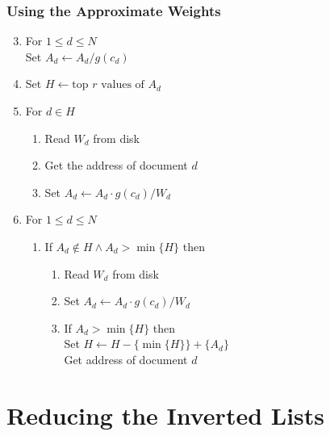 \documentclass[svgnames]{beamer}
\newcommand{\att}{\ensuremath{\leftarrow}}
\begin{document}
\begin{frame}
  \frametitle{Using the Approximate Weights}
  
  \begin{enumerate}
    \setcounter{enumi}{2}
  \item For $1 \leq d \leq N$\\
    \hspace{4ex}Set $A_d \att A_d/g(c_d)$
  \item Set $H \att \text{top $r$ values of $A_d$}$
  \item For $d \in H$
    \begin{enumerate}
    \item Read $W_d$ from disk
    \item Get the address of document $d$
    \item Set $A_d \att A_d \cdot g(c_d) / W_d$
    \end{enumerate}
  \item For $1 \leq d \leq N$
    \begin{enumerate}
    \item If $A_d \not\in H \wedge A_d > \min\{H\}$ then
      \begin{enumerate}
      \item Read $W_d$ from disk
      \item Set $A_d \att A_d \cdot g(c_d)/W_d$
      \item If $A_d > \min\{H\}$ then\\
        \hspace{4ex}Set $H \att H - \{\min\{H\}\} + \{A_d\}$\\
        \hspace{4ex}Get address of document $d$
      \end{enumerate}
    \end{enumerate}
  \end{enumerate}
\end{frame}


\section{Reducing the Inverted Lists}
\end{document}
